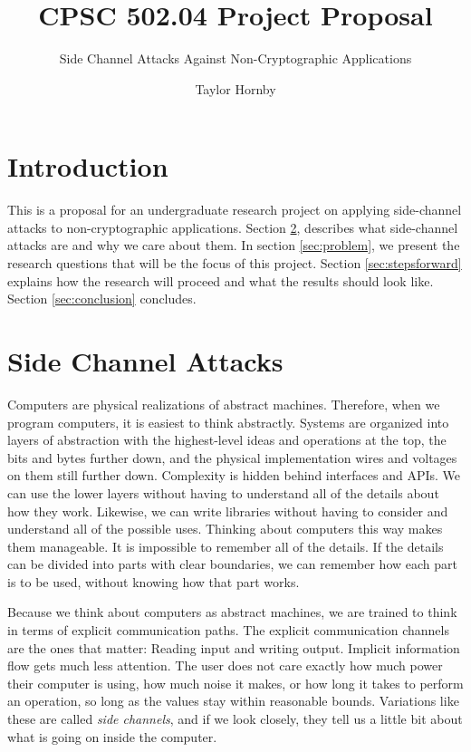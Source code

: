 \documentclass{acm_proc_article-sp}
\begin{document}
\title{CPSC 502.04 Project Proposal}
\subtitle{Side Channel Attacks Against Non-Cryptographic Applications}


\author{
\alignauthor
Taylor Hornby
}

\maketitle

\section{Introduction}

This is a proposal for an undergraduate research project on applying
side-channel attacks to non-cryptographic applications. Section
\ref{sec:attacks}, describes what side-channel attacks are and why we care about
them. In section \ref{sec:problem}, we present the research questions that will
be the focus of this project. Section \ref{sec:stepsforward} explains how the
research will proceed and what the results should look like. Section
\ref{sec:conclusion} concludes.

\section{Side Channel Attacks}
\label{sec:attacks}

Computers are physical realizations of abstract machines. Therefore, when we
program computers, it is easiest to think abstractly. Systems are organized into
layers of abstraction with the highest-level ideas and operations at the top,
the bits and bytes further down, and the physical implementation \textendash
wires and voltages on them \textendash still further down. Complexity is hidden
behind interfaces and APIs. We can use the lower layers without having to
understand all of the details about how they work. Likewise, we can write
libraries without having to consider and understand all of the possible uses.
Thinking about computers this way makes them manageable. It is impossible to
remember all of the details. If the details can be divided into parts with clear
boundaries, we can remember how each part is to be used, without knowing how
that part works.

Because we think about computers as abstract machines, we are trained to think
in terms of explicit communication paths. The explicit communication channels
are the ones that matter: Reading input and writing output. Implicit information
flow gets much less attention. The user does not care exactly how much power
their computer is using, how much noise it makes, or how long it takes to
perform an operation, so long as the values stay within reasonable bounds.
Variations like these are called \emph{side channels}, and if we look closely,
they tell us a little bit about what is going on inside the computer.
\end{document}
